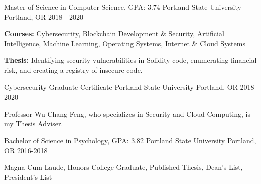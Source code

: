 \noindent{}
\begin{cventries}
  \cventry
    {\normalsize Master of Science in Computer Science, GPA: 3.74} %
    {Portland State University} %
    {\normalsize Portland, OR} %
    {\normalsize 2018 - 2020} %
    {
    \large
      \begin{cvitems} %
         \item 
         {\textbf{Courses:} Cybersecurity, Blockchain Development \&  Security, Artificial Intelligence, Machine Learning, Operating Systems, Internet \& Cloud Systems}
         \item
         {\textbf{Thesis: }Identifying security vulnerabilities in Solidity code, enumerating financial risk, and creating a registry of insecure code.
         }
         \vspace{0.5mm}
      \end{cvitems}
    }

    \cventry
    {\normalsize Cybersecurity Graduate Certificate} %
    {Portland State University} %
    {\normalsize Portland, OR} %
    {\normalsize 2018-2020} %
    {
    \large
      \begin{cvitems} %
         \item 
         {Professor Wu-Chang Feng, who specializes in Security and Cloud Computing, is my Thesis Adviser.}
         \vspace{0.5mm}
      \end{cvitems}
     }

    \cventry
    {\normalsize Bachelor of Science in Psychology, GPA: 3.82} %
    {Portland State University} %
    {\normalsize Portland, OR} %
    {\normalsize 2016-2018} %
    {
    \large
      \begin{cvitems} %
         \item
         {Magna Cum Laude, Honors College Graduate, Published Thesis, Dean's List, President's List}
         \vspace{0.5mm}
      \end{cvitems}
    }
\end{cventries}